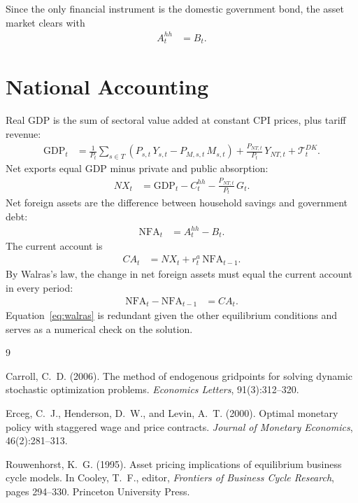 \documentclass[12pt,a4paper]{article}
\begin{document}
Since the only financial instrument is the domestic government bond, the asset market clears with
\begin{align}
    A^{hh}_t &= B_t.
    \label{eq:asset_clearing}
\end{align}


\section{National Accounting}
\label{sec:accounting}

Real GDP is the sum of sectoral value added at constant CPI prices, plus tariff revenue:
\begin{align}
    \text{GDP}_t &= \frac{1}{P_t}
        \sum_{s \in T}\!\left(P_{s,t}\,Y_{s,t} - P_{M,s,t}\,M_{s,t}\right)
        + \frac{P_{NT,t}}{P_t}\,Y_{NT,t}
        + \mathcal{T}^{DK}_t.
    \label{eq:GDP}
\end{align}
Net exports equal GDP minus private and public absorption:
\begin{align}
    NX_t &= \text{GDP}_t - C^{hh}_t - \frac{P_{NT,t}}{P_t}\,G_t.
    \label{eq:NX}
\end{align}
Net foreign assets are the difference between household savings and government debt:
\begin{align}
    \text{NFA}_t &= A^{hh}_t - B_t.
    \label{eq:NFA}
\end{align}
The current account is
\begin{align}
    CA_t &= NX_t + r^a_t\,\text{NFA}_{t-1}.
    \label{eq:CA}
\end{align}
By Walras's law, the change in net foreign assets must equal the current account in every period:
\begin{align}
    \text{NFA}_t - \text{NFA}_{t-1} &= CA_t.
    \label{eq:walras}
\end{align}
Equation~\eqref{eq:walras} is redundant given the other equilibrium conditions and serves as a numerical check on the solution.


\begin{thebibliography}{9}

Carroll, C.~D. (2006).
\newblock The method of endogenous gridpoints for solving dynamic stochastic optimization problems.
\newblock \emph{Economics Letters}, 91(3):312--320.

Erceg, C.~J., Henderson, D.~W., and Levin, A.~T. (2000).
\newblock Optimal monetary policy with staggered wage and price contracts.
\newblock \emph{Journal of Monetary Economics}, 46(2):281--313.

Rouwenhorst, K.~G. (1995).
\newblock Asset pricing implications of equilibrium business cycle models.
\newblock In Cooley, T.~F., editor, \emph{Frontiers of Business Cycle Research}, pages 294--330. Princeton University Press.

\end{thebibliography}
\end{document}
